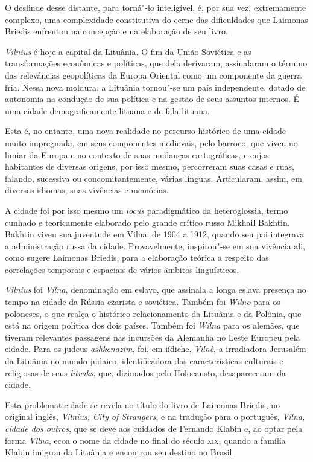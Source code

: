 O deslinde desse distante, para torná"-lo inteligível, é, por sua vez,
extremamente complexo, uma complexidade constitutiva do cerne das
dificuldades que Laimonas Briedis enfrentou na concepção e na elaboração
de seu livro.

\textit{\textit{Vilnius}} é hoje a capital da Lituânia. O fim da União Soviética e as
transformações econômicas e políticas, que dela derivaram, assinalaram o
término das relevâncias geopolíticas da Europa Oriental como um
componente da guerra fria. Nessa nova moldura, a Lituânia tornou"-se um
país independente, dotado de autonomia na condução de sua política e na
gestão de seus assuntos internos. É uma cidade demograficamente lituana
e de fala lituana.

Esta é, no entanto, uma nova realidade no percurso histórico de uma
cidade muito impregnada, em seus componentes medievais, pelo barroco,
que viveu no limiar da Europa e no contexto de suas mudanças
cartográficas, e cujos habitantes de diversas origens, por isso mesmo,
percorreram suas casas e ruas, falando, sucessiva ou concomitantemente,
várias línguas. Articularam, assim, em diversos idiomas, suas vivências
e memórias.

A cidade foi por isso mesmo um \textit{locus} paradigmático da
heteroglossia, termo cunhado e teoricamente elaborado pelo grande
crítico russo Mikhail Bakhtin. Bakhtin viveu sua juventude em Vilna, de
1904 a 1912, quando seu pai integrava a administração russa da cidade.
Provavelmente, inspirou"-se em sua vivência ali, como sugere Laimonas
Briedis, para a elaboração teórica a respeito das correlações temporais
e espaciais de vários âmbitos linguísticos.

\textit{\textit{Vilnius}} foi \textit{Vilna}, denominação em eslavo, que assinala a longa
eslava presença no tempo na cidade da Rússia czarista e soviética.
Também foi \textit{Wilno} para os poloneses, o que realça o histórico
relacionamento da Lituânia e da Polônia, que está na origem política dos
dois países. Também foi \textit{Wilna} para os alemães, que tiveram relevantes
passagens nas incursões da Alemanha no Leste Europeu pela cidade. Para
os judeus \textit{ashkenazim}, foi, em iídiche, \textit{Vilnè}, a irradiadora
Jerusalém da Lituânia no mundo judaico, identificadora das
características culturais e religiosas de seus \textit{litvaks}, que,
dizimados pelo Holocausto, desapareceram da cidade.

Esta problematicidade se revela no título do livro de Laimonas Briedis,
no original inglês, \textit{\textit{Vilnius}, City of Strangers}, e na tradução
para o português, \textit{Vilna, cidade dos outros}, que se deve aos
cuidados de Fernando Klabin e, ao optar pela forma \textit{Vilna}, ecoa o nome
da cidade no final do século \textsc{xix}, quando a família Klabin imigrou da
Lituânia e encontrou seu destino no Brasil.


